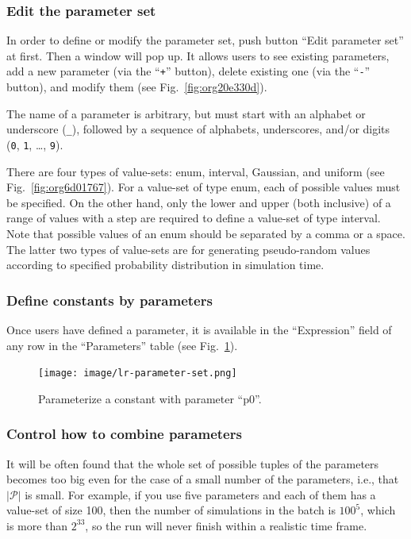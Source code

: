 \documentclass[a4paper,10pt]{report}
\begin{document}
\subsubsection{Edit the parameter set}
\label{sec:orgd0c450a}
In order to define or modify the parameter set, push button ``Edit parameter
set'' at first. Then a window will pop up. It allows users to see existing
parameters, add a new parameter (via the ``\texttt{+}'' button), delete existing
one (via the ``\texttt{-}'' button), and modify them (see
Fig.~\ref{fig:org20e330d}).

The name of a parameter is arbitrary, but must start with an alphabet or
underscore (\texttt{\_}), followed by a sequence of alphabets, underscores, and/or
digits (\texttt{0}, \texttt{1}, \ldots{}, \texttt{9}).

There are four types of value-sets: enum, interval, Gaussian, and uniform
(see Fig.~\ref{fig:org6d01767}).
For a value-set of type enum, each of possible values must be specified.
On the other hand, only the lower and upper (both inclusive) of a range
of values with a step are required to define a value-set of type interval.
Note that possible values of an enum should be separated by a comma or a space.
The latter two types of value-sets are for generating pseudo-random values
according to specified probability distribution in simulation time.

\subsubsection{Define constants by parameters}
\label{sec:org5a7eb73}
Once users have defined a parameter, it is available in the ``Expression'' field
of any row in the ``Parameters'' table (see Fig.~\ref{fig:org76e31c8}).

\begin{figure}[htbp]
\centering
\texttt{[image: image/lr-parameter-set.png]}
\caption{\label{fig:org76e31c8}Parameterize a constant with parameter ``p0''.}
\end{figure}

\subsubsection{\label{org92856ff}Control how to combine parameters}
\label{sec:org0356b8b}
It will be often found that the whole set of possible tuples of the parameters
becomes too big even for the case of a small number of the parameters, i.e., that
\(\lvert \mathcal{P} \rvert\) is small. For example, if you use five parameters
and each of them has a value-set of size 100, then the number of simulations
in the batch is \(100^5\), which is more than \(2^{33}\), so the run will never finish
within a realistic time frame.
\end{document}

